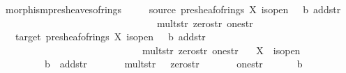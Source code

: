\documentclass[12pt]{scrartcl}
\begin{document}
\begin{isabelle}
\isamarkupfalse%
\ morphism{\isacharunderscore}{\kern0pt}presheaves{\isacharunderscore}{\kern0pt}of{\isacharunderscore}{\kern0pt}rings\ {\isacharequal}{\kern0pt}\isanewline
\ \ \ \ source{\isacharcolon}{\kern0pt}\ presheaf{\isacharunderscore}{\kern0pt}of{\isacharunderscore}{\kern0pt}rings\ X\ is{\isacharunderscore}{\kern0pt}open\ {\isasymFF}\ {\isasymrho}\ b\ add{\isacharunderscore}{\kern0pt}str\isanewline
\ \ \ \ \ \ \ \ \ \ \ \ \ \ \ \ \ \ \ \ \ \ \ \ \ \ \ \ \ \ \ \ mult{\isacharunderscore}{\kern0pt}str\ zero{\isacharunderscore}{\kern0pt}str\ one{\isacharunderscore}{\kern0pt}str\isanewline
\ \ {\isacharplus}{\kern0pt}\ target{\isacharcolon}{\kern0pt}\ presheaf{\isacharunderscore}{\kern0pt}of{\isacharunderscore}{\kern0pt}rings\ X\ is{\isacharunderscore}{\kern0pt}open\ {\isasymFF}{\isacharprime}{\kern0pt}\ {\isasymrho}{\isacharprime}{\kern0pt}\ b{\isacharprime}{\kern0pt}\ add{\isacharunderscore}{\kern0pt}str{\isacharprime}{\kern0pt}\ \isanewline
\ \ \ \ \ \ \ \ \ \ \ \ \ \ \ \ \ \ \ \ \ \ \ \ \ \ \ \ \ mult{\isacharunderscore}{\kern0pt}str{\isacharprime}{\kern0pt}\ zero{\isacharunderscore}{\kern0pt}str{\isacharprime}{\kern0pt}\ one{\isacharunderscore}{\kern0pt}str{\isacharprime}{\kern0pt}\isanewline
\ \ \ X\ \ is{\isacharunderscore}{\kern0pt}open\isanewline
\ \ \ \ \ {\isasymFF}\ \ {\isasymrho}\ \ b\ \ add{\isacharunderscore}{\kern0pt}str\ {\isacharparenleft}{\kern0pt}{\isachardoublequoteopen}{\isacharplus}{\kern0pt}\isactrlbsub {\isacharunderscore}{\kern0pt}\isactrlesub {\isachardoublequoteclose}{\isacharparenright}{\kern0pt}\ \isanewline
\ \ \ \ \ mult{\isacharunderscore}{\kern0pt}str\ {\isacharparenleft}{\kern0pt}{\isachardoublequoteopen}{\isasymcdot}\isactrlbsub {\isacharunderscore}{\kern0pt}\isactrlesub {\isachardoublequoteclose}{\isacharparenright}{\kern0pt}\ \ zero{\isacharunderscore}{\kern0pt}str\ {\isacharparenleft}{\kern0pt}{\isachardoublequoteopen}{\isasymzero}\isactrlbsub {\isacharunderscore}{\kern0pt}\isactrlesub {\isachardoublequoteclose}{\isacharparenright}{\kern0pt}\ \isanewline
\ \ \ \ \ one{\isacharunderscore}{\kern0pt}str\ {\isacharparenleft}{\kern0pt}{\isachardoublequoteopen}{\isasymone}\isactrlbsub {\isacharunderscore}{\kern0pt}\isactrlesub {\isachardoublequoteclose}{\isacharparenright}{\kern0pt}\ \ {\isasymFF}{\isacharprime}{\kern0pt}\ \ {\isasymrho}{\isacharprime}{\kern0pt}\ \ b{\isacharprime}{\kern0pt}\ \isanewline

\end{isabelle}
\end{document}
